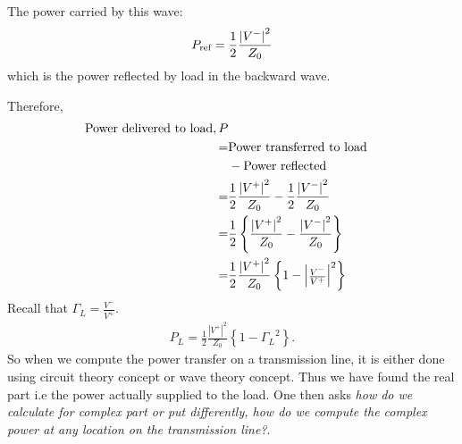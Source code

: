 The power carried by this wave:
\begin{align*}
P_{\textnormal{ref}} = \frac{1}{2}\frac{{|V^-|}^2}{Z_0}
\end{align*}
which is the power reflected by load in the backward wave.

Therefore,
\begin{align*} 
\textnormal{Power delivered to load}, P\\
=& \textnormal{Power transferred to load}\\
&- \textnormal{Power reflected}\\
=& \frac{1}{2} \frac{{|V^+|}^2}{Z_0} -\frac{1}{2} \frac{{|V^-|}^2 }{Z_0}\\
=& \frac{1}{2} \left\lbrace \frac{{|V^+| }^2}{Z_0} -\frac{ {|V^-|}^2 }{Z_0} \right\rbrace\\
=& \frac{1}{2} \frac{{|V^+|}^2}{Z_0} \left\lbrace 1 - {
\begin{vmatrix}
\frac{V^-}{V^+}
\end{vmatrix}^2}\right\rbrace
\end{align*}
Recall that $\Gamma_L =\frac{V^-}{V^+}$.
\begin{align*}
P_L=\frac{1}{2} \frac{{|V^+|}^2}{Z_0} \left\lbrace 1 - { \Gamma_L }^2 \right\rbrace.
\end{align*}
So when we compute the power transfer on a transmission line, it is either done using circuit theory concept or wave theory concept. Thus we have found the real part i.e the power actually supplied to the load. One then asks \emph{how do we calculate for complex part or put differently, how do we compute the complex power at any location on the transmission line?}. 

